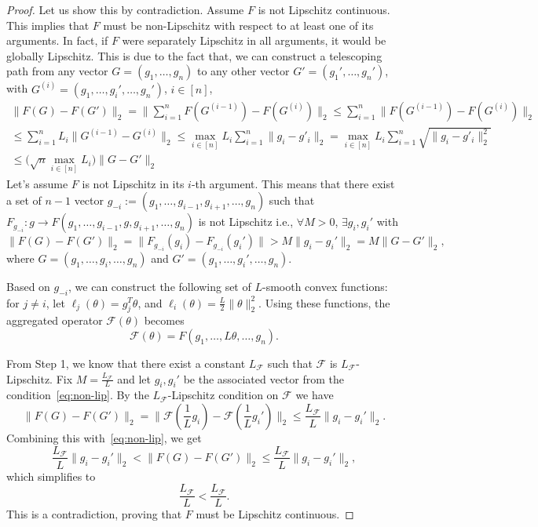 \documentclass[twoside,11pt]{article}
\newcommand{\F}{\mathcal{F}}
\begin{document}
\begin{proof}
    Let us show this by contradiction. Assume $F$ is not Lipschitz continuous. 
    This implies that $F$ must be non-Lipschitz with respect to at least one of its arguments. 
    In fact, if $F$ were separately Lipschitz in all arguments, it would be globally Lipschitz. 
    This is due to the fact that, we can construct a telescoping path from any vector $G = (g_1, \ldots, g_n)$ to any other vector $G' = (g_1', \ldots, g_n')$, with $G^{(i)} = (g_1, \ldots, g_i', \ldots, g_n')$, $i\in[n]$,
    \begin{multline*}
        \| F(G) - F(G') \|_2 = \| \sum_{i=1}^n F(G^{(i-1)}) - F(G^{(i)}) \|_2 
        \leq \sum_{i=1}^n \| F(G^{(i-1)}) - F(G^{(i)}) \|_2 \\
        \leq \sum_{i=1}^n L_i \| G^{(i-1)} - G^{(i)} \|_2 
        \leq \max_{i\in[n]} L_i \sum_{i=1}^n \| g_i - g'_i \|_2 
        = \max_{i\in[n]} L_i \sum_{i=1}^n \sqrt{\| g_i - g'_i \|_2^2} \\
        \leq \big(\sqrt{n} \max_{i\in[n]} L_i \big) \| G - G' \|_2
    \end{multline*} 
    Let's assume $F$ is not Lipschitz in its $i$-th argument. 
    This means that there exist a set of $n-1$ vector $g_{-i}:=(g_1,\ldots,g_{i-1},g_{i+1},\ldots,g_n)$ such that $F_{g_{-i}}:g\rightarrow F(g_1,\ldots,g_{i-1},g,g_{i+1},\ldots,g_n)$ is not Lipschitz i.e., $\forall M>0$, $\exists g_i,g_i'$ with
    \begin{equation}
        \label{eq:non-lip}
        \| F(G) - F(G') \|_2 = \|F_{g_{-i}}(g_i) - F_{g_{-i}}(g_i')\| > M \| g_i - g_i' \|_2 = M \| G - G' \|_2 ,
    \end{equation}
    where $G = (g_1, \ldots, g_i, \ldots, g_n)$ and $G' = (g_1, \ldots, g_i', \ldots, g_n)$.


    Based on $g_{-i}$, we can construct the following set of $L$-smooth convex functions: for $j \ne i$, let $\ell_j(\theta) = g_j^T \theta$, and $\ell_i(\theta) = \frac{L}{2} \| \theta \|_2^2$. 
    Using these functions, the aggregated operator $\F(\theta)$ becomes
    \[
        \F(\theta) = F(g_1, \ldots, L\theta, \ldots, g_n).
    \]

    From Step 1, we know that there exist a constant $L_\F$ such that $\F$ is $L_\F$-Lipschitz. Fix $M=\frac{L_\F}{L}$ and let $g_i,g_i'$ be the associated vector from the condition~\eqref{eq:non-lip}. By the $L_{\F}$-Lipschitz condition on $\F$ we have
    \[
        \| F(G) - F(G') \|_2 = \| \F(\frac{1}{L}g_i) - \F(\frac{1}{L}g_i') \|_2 \le \frac{L_{\F}}{L} \| g_i - g_i' \|_2.
    \]
    Combining this with~\eqref{eq:non-lip}, we get
    \[
        \frac{L_{\F}}{L} \| g_i - g_i' \|_2 < \| F(G) - F(G') \|_2 \leq \frac{L_{\F}}{L} \| g_i - g_i' \|_2,
    \]
    which simplifies to
    \[
        \frac{L_{\F}}{L} < \frac{L_{\F}}{L}.
    \]
    This is a contradiction, proving that $F$ must be Lipschitz continuous.
\end{proof}
\end{document}
